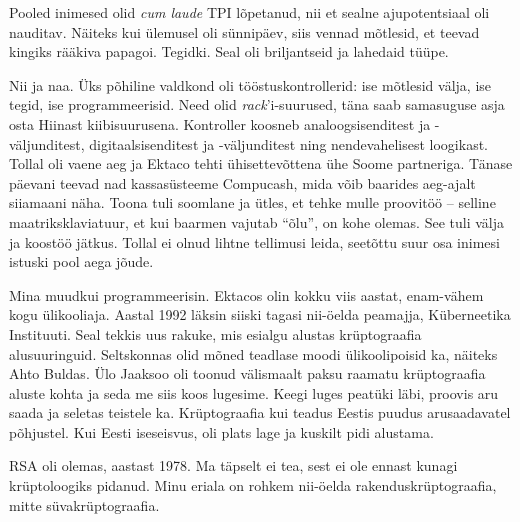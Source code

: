 Pooled inimesed olid \emph{cum laude} TPI lõpetanud, nii et sealne 
ajupotentsiaal oli nauditav. Näiteks kui ülemusel oli sünnipäev, siis
vennad mõtlesid, et teevad kingiks rääkiva papagoi. Tegidki. Seal oli 
briljantseid ja lahedaid tüüpe. 


Nii ja naa. Üks põhiline valdkond oli 
tööstuskontrollerid: ise mõtlesid välja, ise tegid, ise programmeerisid. Need olid 
\emph{rack}'i-suurused, täna saab samasuguse asja osta Hiinast 
kiibisuurusena. Kontroller koosneb analoogsisenditest ja 
-väljunditest, digitaalsisenditest ja -väljunditest ning nendevahelisest 
loogikast. 
Tollal oli vaene aeg ja Ektaco tehti ühisettevõttena ühe Soome partneriga. Tänase 
päevani teevad nad kassasüsteeme Compucash, mida võib 
baarides aeg-ajalt siiamaani näha. Toona tuli soomlane ja ütles, et tehke mulle 
proovitöö -- selline maatriksklaviatuur, et kui baarmen vajutab \enquote{õlu}, on 
kohe olemas. See tuli välja ja koostöö jätkus. Tollal ei olnud lihtne 
tellimusi leida, seetõttu suur osa
inimesi istuski pool aega jõude. 


Mina muudkui programmeerisin. Ektacos olin kokku viis aastat, enam-vähem kogu
ülikooliaja. Aastal 1992 läksin siiski tagasi
nii-öelda peamajja, Küberneetika Instituuti. Seal tekkis uus rakuke, mis esialgu alustas krüptograafia alusuuringuid. Seltskonnas 
olid mõned teadlase moodi ülikoolipoisid ka, näiteks Ahto Buldas. Ülo Jaaksoo oli 
toonud välismaalt paksu raamatu krüptograafia aluste kohta ja seda me siis koos 
lugesime. Keegi luges peatüki läbi, proovis aru saada ja seletas 
teistele ka. Krüptograafia kui teadus Eestis puudus arusaadavatel põhjustel. Kui Eesti
iseseisvus, oli plats lage ja kuskilt pidi alustama.


RSA oli olemas, aastast 1978. Ma täpselt ei tea, sest ei ole ennast 
kunagi krüptoloogiks pidanud. Minu eriala on rohkem nii-öelda 
rakenduskrüptograafia, mitte süvakrüptograafia.


